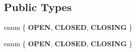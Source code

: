 \subsection*{Public Types}
\begin{DoxyCompactItemize}
\item 
\mbox{\label{classtinyxml2_1_1XMLElement_aa0644b740da41757ae91762d1fb366df}} 
enum \{ {\bfseries O\+P\+EN}, 
{\bfseries C\+L\+O\+S\+ED}, 
{\bfseries C\+L\+O\+S\+I\+NG}
 \}
\item 
\mbox{\label{classtinyxml2_1_1XMLElement_a4fd02eb14bb579d6abbb3db2e1392cc3}} 
enum \{ {\bfseries O\+P\+EN}, 
{\bfseries C\+L\+O\+S\+ED}, 
{\bfseries C\+L\+O\+S\+I\+NG}
 \}
\end{DoxyCompactItemize}
